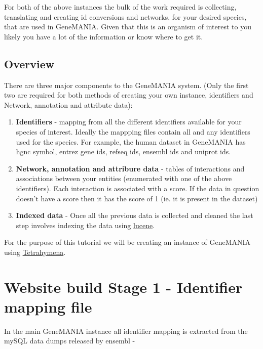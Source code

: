 \documentclass[]{book}
\providecommand{\tightlist}{%
  \setlength{\itemsep}{0pt}\setlength{\parskip}{0pt}}
\begin{document}
For both of the above instances the bulk of the work required is
collecting, translating and creating id conversions and networks, for
your desired species, that are used in GeneMANIA. Given that this is an
organism of interest to you likely you have a lot of the information or
know where to get it.

\section{Overview}\label{overview}

There are three major components to the GeneMANIA system. (Only the
first two are required for both methods of creating your own instance,
identifiers and Network, annotation and attribute data):

\begin{enumerate}
\def\labelenumi{\arabic{enumi}.}
\tightlist
\item
  \textbf{Identifiers} - mapping from all the different identifiers
  available for your species of interest. Ideally the mappping files
  contain all and any identifiers used for the species. For example, the
  human dataset in GeneMANIA has hgnc symbol, entrez gene ids, refseq
  ids, ensembl ids and uniprot ids.
\item
  \textbf{Network, annotation and attribure data} - tables of
  interactions and associations between your entities (enumerated with
  one of the above identifiers). Each interaction is associated with a
  score. If the data in question doesn't have a score then it has the
  score of 1 (ie. it is present in the dataset)
\item
  \textbf{Indexed data} - Once all the previous data is collected and
  cleaned the last step involves indexing the data using
  \href{https://lucene.apache.org/}{lucene}.
\end{enumerate}

For the purpose of this tutorial we will be creating an instance of
GeneMANIA using
\href{http://ciliate.org/index.php/home/welcome}{Tetrahymena}.

\chapter{Website build Stage 1 - Identifier mapping
file}\label{website-build-stage-1---identifier-mapping-file}

In the main GeneMANIA instance all identifier mapping is extracted from
the mySQL data dumps released by ensembl -
\end{document}
